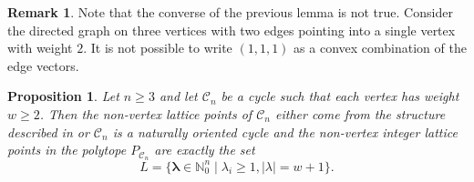 \documentclass [12pt,a4paper,reqno]{amsart}
\theoremstyle{plain}
\newtheorem{Proposition}[Theorem]{Proposition}
\theoremstyle{definition}
\newtheorem{Assumptions and Discussion}[Theorem]{Assumptions and Discussion}
\newtheorem{Remark}[Theorem]{Remark}
\theoremstyle{remark}
\newcommand\bflam{\boldsymbol{\lambda}}
\newcommand\calC{\mathcal{C}}
\begin{document}
\begin{Remark}
    Note that the converse of the previous lemma is not true. Consider the directed graph on three vertices with two edges pointing into a single vertex with weight $2$. It is not possible to write $(1,1,1)$ as a convex combination of the edge vectors. 
\end{Remark}


\begin{Proposition}\label{CyclenonVertexLatticePoints}
    Let $n\geq 3$ and let $\calC_n$ be a cycle such that each vertex has weight $w \geq 2$. Then the non-vertex lattice points of $\calC_n$ either come from the structure described in  or $\calC_n$ is a naturally oriented cycle and the non-vertex integer lattice points in the polytope $P_{\calC_n}$ are exactly the set
\[
L = \{ \bflam \in \mathbb{N}_0^n \mid \lambda_i \geq 1, |\lambda| = w+1\}.
\]
\end{Proposition}
\end{document}
